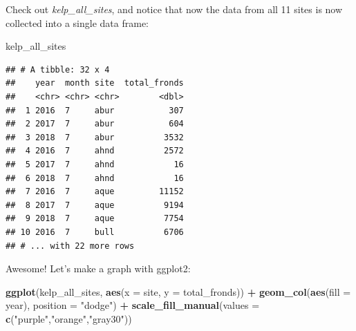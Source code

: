 \documentclass[]{book}
\newenvironment{Shaded}{\begin{snugshade}}{\end{snugshade}}
\newcommand{\DataTypeTok}[1]{\textcolor[rgb]{0.13,0.29,0.53}{#1}}
\newcommand{\KeywordTok}[1]{\textcolor[rgb]{0.13,0.29,0.53}{\textbf{#1}}}
\newcommand{\NormalTok}[1]{#1}
\newcommand{\OperatorTok}[1]{\textcolor[rgb]{0.81,0.36,0.00}{\textbf{#1}}}
\newcommand{\StringTok}[1]{\textcolor[rgb]{0.31,0.60,0.02}{#1}}
\begin{document}
\begin{Shaded}
\end{Shaded}

Check out \emph{kelp\_all\_sites}, and notice that now the data from all 11 sites is now collected into a single data frame:

\begin{Shaded}
\begin{Highlighting}[]
\NormalTok{kelp_all_sites}
\end{Highlighting}
\end{Shaded}

\begin{verbatim}
## # A tibble: 32 x 4
##    year  month site  total_fronds
##    <chr> <chr> <chr>        <dbl>
##  1 2016  7     abur           307
##  2 2017  7     abur           604
##  3 2018  7     abur          3532
##  4 2016  7     ahnd          2572
##  5 2017  7     ahnd            16
##  6 2018  7     ahnd            16
##  7 2016  7     aque         11152
##  8 2017  7     aque          9194
##  9 2018  7     aque          7754
## 10 2016  7     bull          6706
## # ... with 22 more rows
\end{verbatim}

Awesome! Let's make a graph with ggplot2:

\begin{Shaded}
\begin{Highlighting}[]
\KeywordTok{ggplot}\NormalTok{(kelp_all_sites, }\KeywordTok{aes}\NormalTok{(}\DataTypeTok{x =}\NormalTok{ site, }\DataTypeTok{y =}\NormalTok{ total_fronds)) }\OperatorTok{+}
\StringTok{  }\KeywordTok{geom_col}\NormalTok{(}\KeywordTok{aes}\NormalTok{(}\DataTypeTok{fill =}\NormalTok{ year), }\DataTypeTok{position =} \StringTok{"dodge"}\NormalTok{) }\OperatorTok{+}
\StringTok{  }\KeywordTok{scale_fill_manual}\NormalTok{(}\DataTypeTok{values =} \KeywordTok{c}\NormalTok{(}\StringTok{"purple"}\NormalTok{,}\StringTok{"orange"}\NormalTok{,}\StringTok{"gray30"}\NormalTok{))}
\end{Highlighting}
\end{Shaded}
\end{document}
